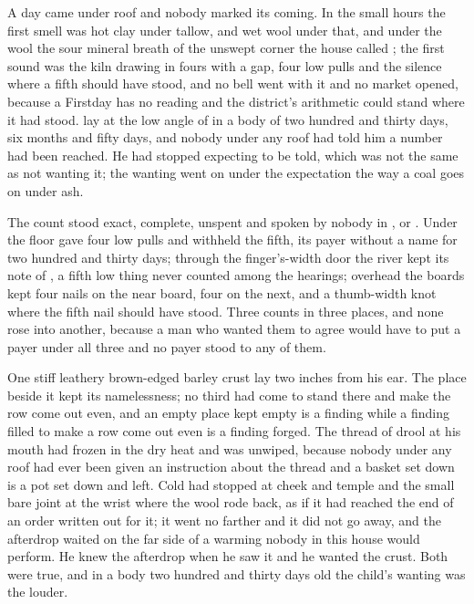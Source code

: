 
A day came under  roof and nobody marked its coming. In the small hours the first smell was hot clay under tallow, and wet wool under that, and under the wool the sour mineral breath of the unswept corner the house called ; the first sound was the kiln drawing in fours with a gap, four low pulls and the silence where a fifth should have stood, and no bell went with it and no market opened, because a Firstday has no reading and the district's arithmetic could stand where it had stood.  lay at the low angle of  in a body of two hundred and thirty days, six months and fifty days, and nobody under any roof had told him a number had been reached. He had stopped expecting to be told, which was not the same as not wanting it; the wanting went on under the expectation the way a coal goes on under ash.

The count stood exact, complete, unspent and spoken by nobody in ,  or . Under the floor  gave four low pulls and withheld the fifth, its payer without a name for two hundred and thirty days; through the finger's-width door the river kept its note of , a fifth low thing never counted among the hearings; overhead the boards kept four nails on the near board, four on the next, and a thumb-width knot where the fifth nail should have stood. Three counts in three places, and none rose into another, because a man who wanted them to agree would have to put a payer under all three and no payer stood to any of them.

One stiff leathery brown-edged barley crust lay two inches from his ear. The place beside it kept its namelessness; no third had come to stand there and make the row come out even, and an empty place kept empty is a finding while a finding filled to make a row come out even is a finding forged. The thread of drool at his mouth had frozen in the dry heat and was unwiped, because nobody under any roof had ever been given an instruction about the thread and a basket set down is a pot set down and left. Cold had stopped at cheek and temple and the small bare joint at the wrist where the wool rode back, as if it had reached the end of an order written out for it; it went no farther and it did not go away, and the afterdrop waited on the far side of a warming nobody in this house would perform. He knew the afterdrop when he saw it and he wanted the crust. Both were true, and in a body two hundred and thirty days old the child's wanting was the louder.

